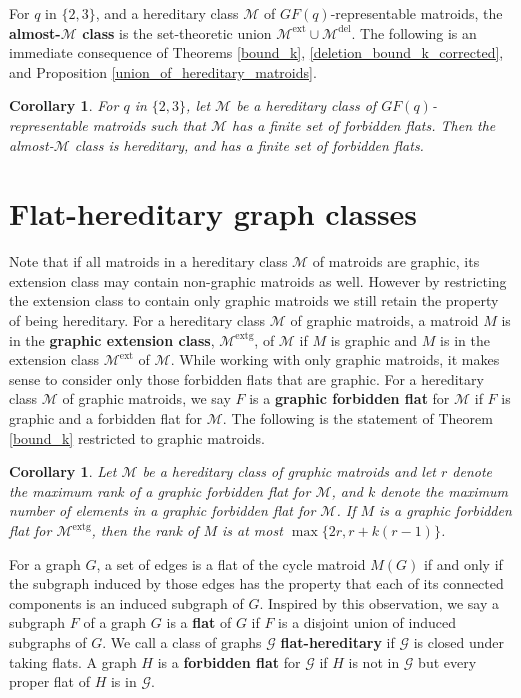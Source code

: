 \documentclass[11pt]{amsart}
\newtheorem{corollary}[theorem]{Corollary}
\theoremstyle{definition}
\theoremstyle{remark}
\numberwithin{equation}{section}
\newcommand\Me{\mathcal{M}^\mathrm{ext}}
\newcommand\Md{\mathcal{M}^\mathrm{del}}
\newcommand\Meg{\mathcal{M}^\mathrm{extg}}
\begin{document}
For $q$ in $\{2,3\}$, and a hereditary class $\mathcal{M}$ of $GF(q)$-representable matroids, the \textbf{almost-$\mathcal{M}$ class} is the set-theoretic union $\Me \cup \Md$. The following is an immediate consequence of Theorems \ref{bound_k}, \ref{deletion_bound_k_corrected}, and Proposition \ref{union_of_hereditary_matroids}. 


\begin{corollary}
\label{matroid_corollary}
For $q$ in $\{2,3\}$, let $\mathcal{M}$ be a hereditary class of $GF(q)$-representable matroids such that $\mathcal{M}$ has a finite set of forbidden flats. Then the almost-$\mathcal{M}$ class is hereditary, and has a finite set of forbidden flats. 
\end{corollary}


\section{Flat-hereditary graph classes}

Note that if all matroids in a hereditary class $\mathcal{M}$ of matroids are graphic, its extension class may contain non-graphic matroids as well. However by restricting the extension class to contain only graphic matroids we still retain the property of being hereditary. For a hereditary class $\mathcal{M}$ of graphic matroids, a matroid $M$ is in the \textbf{graphic extension class}, $\Meg$, of $\mathcal{M}$ if $M$ is graphic and $M$ is in the extension class $\Me$ of $\mathcal{M}$. While working with only graphic matroids, it makes sense to consider only those forbidden flats that are graphic. For a hereditary class $\mathcal{M}$ of graphic matroids, we say $F$ is a \textbf{graphic forbidden flat} for $\mathcal{M}$ if $F$ is graphic and a forbidden flat for $\mathcal{M}$. The following is the statement of Theorem \ref{bound_k} restricted to graphic matroids.


\begin{corollary}
\label{bound_k_corollary}
Let $\mathcal{M}$ be a hereditary class of graphic matroids and let $r$ denote the maximum rank of a graphic forbidden flat for $\mathcal{M}$, and $k$ denote the maximum number of elements in a graphic forbidden flat for $\mathcal{M}$. If $M$ is a graphic forbidden flat for $\Meg$, then the rank of $M$ is at most $\max\{2r, r + k(r-1)\}$. 
\end{corollary}


For a graph $G$, a set of edges is a flat of the cycle matroid $M(G)$ if and only if the subgraph induced by those edges has the property that each of its connected components is an induced subgraph of $G$. Inspired by this observation, we say a subgraph $F$ of a graph $G$ is a \textbf{flat} of $G$ if $F$ is a disjoint union of induced subgraphs of $G$. We call a class of graphs $\mathcal{G}$ \textbf{flat-hereditary} if $\mathcal{G}$ is closed under taking flats. A graph $H$ is a \textbf{forbidden flat} for $\mathcal{G}$ if $H$ is not in $\mathcal{G}$ but every proper flat of $H$ is in $\mathcal{G}$. 
\end{document}
